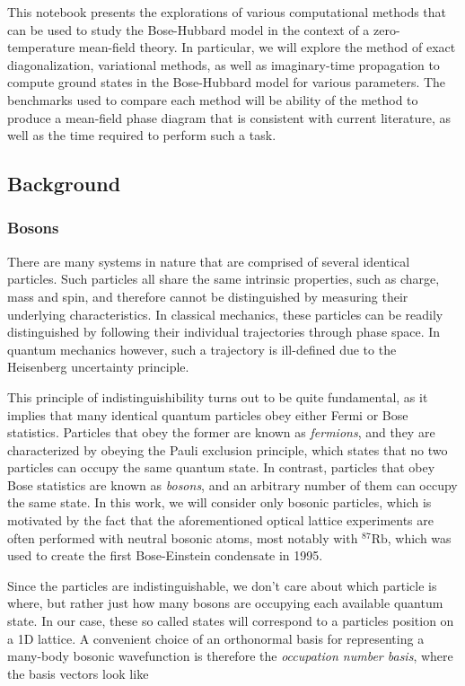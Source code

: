 \documentclass[11pt]{article}
\begin{document}
This notebook presents the explorations of various computational methods
that can be used to study the Bose-Hubbard model in the context of a
zero-temperature mean-field theory. In particular, we will explore the
method of exact diagonalization, variational methods, as well as
imaginary-time propagation to compute ground states in the Bose-Hubbard
model for various parameters. The benchmarks used to compare each method
will be ability of the method to produce a mean-field phase diagram that
is consistent with current literature, as well as the time required to
perform such a task.

    \hypertarget{background}{%
\subsection{Background}\label{background}}

    \hypertarget{bosons}{%
\subsubsection{Bosons}\label{bosons}}

    There are many systems in nature that are comprised of several identical
particles. Such particles all share the same intrinsic properties, such
as charge, mass and spin, and therefore cannot be distinguished by
measuring their underlying characteristics. In classical mechanics,
these particles can be readily distinguished by following their
individual trajectories through phase space. In quantum mechanics
however, such a trajectory is ill-defined due to the Heisenberg
uncertainty principle.

This principle of indistinguishibility turns out to be quite
fundamental, as it implies that many identical quantum particles obey
either Fermi or Bose statistics. Particles that obey the former are
known as \emph{fermions}, and they are characterized by obeying the
Pauli exclusion principle, which states that no two particles can occupy
the same quantum state. In contrast, particles that obey Bose statistics
are known as \emph{bosons}, and an arbitrary number of them can occupy
the same state. In this work, we will consider only bosonic particles,
which is motivated by the fact that the aforementioned optical lattice
experiments are often performed with neutral bosonic atoms, most notably
with \(^{87}\text{Rb}\), which was used to create the first
Bose-Einstein condensate in 1995.

Since the particles are indistinguishable, we don't care about which
particle is where, but rather just how many bosons are occupying each
available quantum state. In our case, these so called states will
correspond to a particles position on a 1D lattice. A convenient choice
of an orthonormal basis for representing a many-body bosonic
wavefunction is therefore the \emph{occupation number basis}, where the
basis vectors look like
\end{document}
